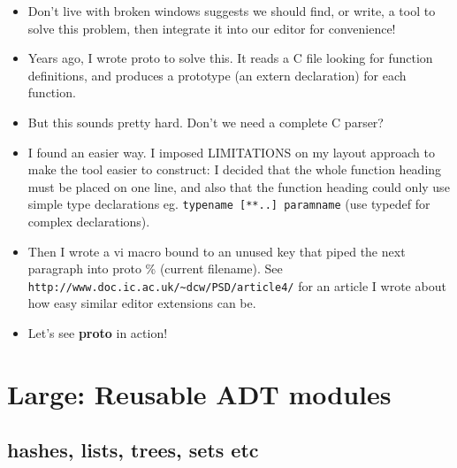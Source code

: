 \documentclass[handout,]{beamer}
\newcommand{\pitem}{\pause \item}
\begin{document}
\begin{frame}[fragile]
    \begin{itemize}
    \item
      \alert{Don't live with broken windows} suggests we should find, or
      write, a tool to solve this problem,
      then integrate it into our editor for convenience!

    \pitem
      Years ago, I wrote \alert{proto} to solve this.
      It reads a C file looking for function definitions, and
      produces a prototype (an extern declaration) for each function.

    \pitem
      But this sounds pretty hard.  Don't we need a complete C
      parser?
    \pitem
      I found an easier way.
      I imposed LIMITATIONS on my layout approach to make the tool easier
      to construct: I decided that the
      \alert{whole function heading must be placed on one line}, and
      also that the function heading could
      \alert{only use simple type declarations}
      eg. \verb+typename [**..] paramname+
      (use \alert{typedef} for complex declarations).

    \pitem
      Then I wrote a vi macro bound to an unused key that
      piped the next paragraph into \alert{proto \%} (current filename).
      \pause
      See
      \verb+http://www.doc.ic.ac.uk/~dcw/PSD/article4/+
      for an article I wrote about how easy similar editor extensions
      can be.

    \pitem
     Let's see {\bf proto} in action!


    \end{itemize}
\end{frame}

\section{Large: Reusable ADT modules}
\subsection{hashes, lists, trees, sets etc}
\end{document}
